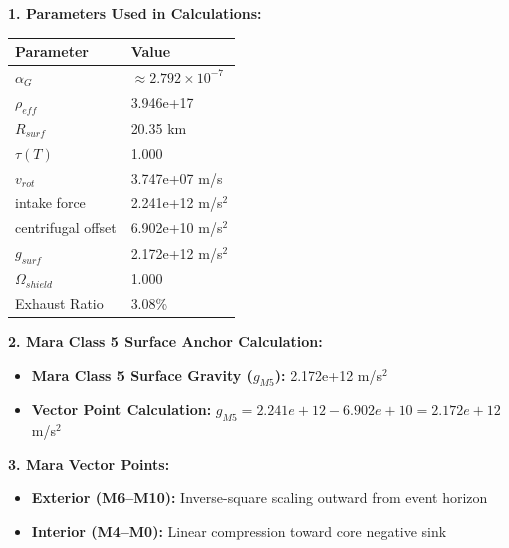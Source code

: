 \documentclass[11pt, a4paper]{article}
\begin{document}
\vspace{0.5em}
\noindent \textbf{1. Parameters Used in Calculations:}
\begin{center}
  \begin{tabular}{|l|l|}
    \hline
    \textbf{Parameter} & \textbf{Value} \\ \hline
    $\alpha_G$ & $\approx 2.792 \times 10^{-7}$ \\ \hline
    $\rho_{eff}$ & 3.946e+17 \\ \hline
    $R_{surf}$ & 20.35 km \\ \hline
    $\tau(T)$ & 1.000 \\ \hline
    $v_{rot}$ & 3.747e+07 m/s \\ \hline
    intake force & 2.241e+12 m/s$^2$ \\ \hline
    centrifugal offset & 6.902e+10 m/s$^2$ \\ \hline
    $g_{surf}$ & 2.172e+12 m/s$^2$ \\ \hline
    $\Omega_{shield}$ & 1.000 \\ \hline
    Exhaust Ratio & 3.08\% \\ \hline
  \end{tabular}
\end{center}

\vspace{0.5em}
\noindent \textbf{2. Mara Class 5 Surface Anchor Calculation:}
\begin{itemize}
  \item \textbf{Mara Class 5 Surface Gravity ($g_{M5}$):} 2.172e+12 m/s$^2$
  \item \textbf{Vector Point Calculation:} $g_{M5} = 2.241e+12 - 6.902e+10 = 2.172e+12$ m/s$^2$
\end{itemize}

\vspace{0.5em}
\noindent \textbf{3. Mara Vector Points:}
\begin{itemize}
  \item \textbf{Exterior (M6--M10):} Inverse-square scaling outward from event horizon
  \item \textbf{Interior (M4--M0):} Linear compression toward core negative sink
\end{itemize}
\end{document}
